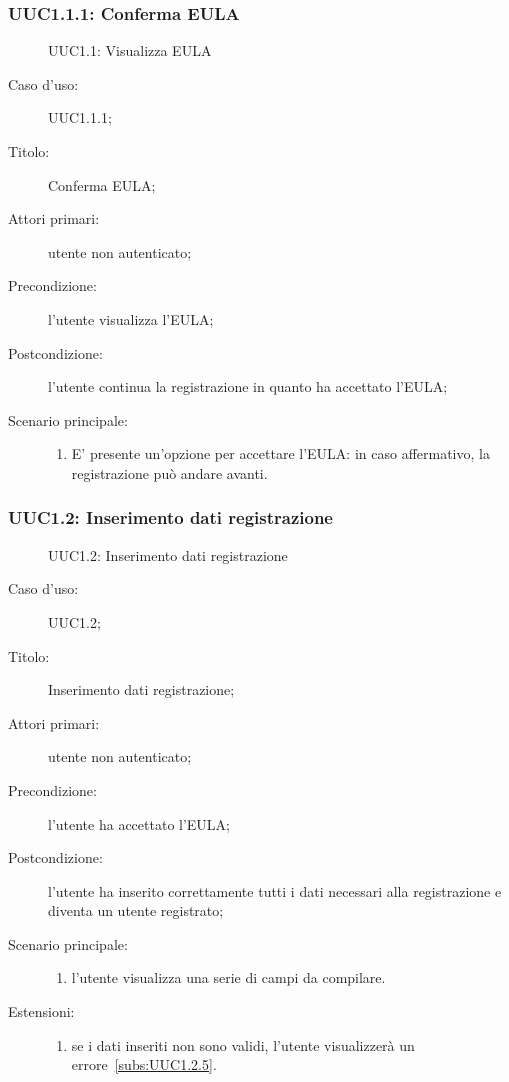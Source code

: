 \documentclass[../../../analisi-dei-requisiti.tex]{subfiles}
\begin{document}
\subsubsection{UUC1.1.1: Conferma EULA}%
\label{subs:UUC1.1.1}

\begin{figure}[H]
  \centering
  \caption{UUC1.1: Visualizza EULA}%
  \label{fig:uuc1.1}
\end{figure}


\begin{description}
  \item[Caso d’uso:] UUC1.1.1;
  \item[Titolo:] Conferma EULA;
  \item[Attori primari:] utente non autenticato;
  \item[Precondizione:] l'utente visualizza l'EULA;
  \item[Postcondizione:] l'utente continua la registrazione in quanto ha accettato l'EULA;
  \item[Scenario principale:]
        \begin{enumerate}
          \item E' presente un'opzione per accettare l'EULA: in caso affermativo, la registrazione può andare avanti.
        \end{enumerate}
\end{description}

\subsubsection{UUC1.2: Inserimento dati registrazione}%
\label{subs:UUC1.2}

\begin{figure}[H]
  \centering
  \caption{UUC1.2: Inserimento dati registrazione}%
  \label{fig:uuc1_2}
\end{figure}

\begin{description}
  \item[Caso d’uso:] UUC1.2;
  \item[Titolo:] Inserimento dati registrazione;
  \item[Attori primari:] utente non autenticato;
  \item[Precondizione:] l'utente ha accettato l'EULA;
  \item[Postcondizione:] l'utente ha inserito correttamente tutti i dati necessari alla registrazione e diventa un utente registrato;
  \item[Scenario principale:]
  \begin{enumerate}
    \item l'utente visualizza una serie di campi da compilare.
  \end{enumerate}
  \item[Estensioni:]
  \begin{enumerate}
    \item se i dati inseriti non sono validi, l'utente visualizzerà un errore~\ref{subs:UUC1.2.5}.
  \end{enumerate}
\end{description}
\end{document}
